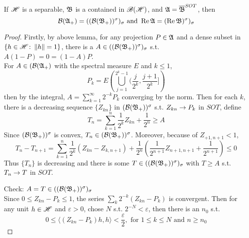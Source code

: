 \documentclass[a4paper,11pt]{report}
\begin{document}
\begin{thm}
	If $\mathscr{H}$ is a separable,  $\mathfrak{B}$ is a \Cs contained in $\mathscr{B(H)}$, and $\mathfrak{A} = \overline{\mathfrak{B}}^{SOT}$, then
	\begin{equation*}
		\mathcal{B}(\mathfrak{A}_+) = ((\mathcal{B}(\mathfrak{B}_+))^{\sigma})_{\sigma} \text{ and } \operatorname{Re}{\mathfrak{A}} = (\operatorname{Re}{\mathfrak{B}})^{\sigma})_{\sigma}
	\end{equation*}
\end{thm}
\begin{proof}
	Firstly, by above lemma, for any projection $P \in \mathfrak{A}$ and a dense subset in $\{h \in \mathscr{H} \colon \left\lVert h\right\lVert =1\}$, there is a $A \in ((\mathcal{B}(\mathfrak{B}_+))^{\sigma})_{\sigma}$ s.t. $A(1-P) = 0  = (1-A)P$.\\
	For $A \in (\mathcal{B}(\mathfrak{A}_+)$ with the spectral measure $E$ and $k \leqslant 1$,
	\begin{equation*}
		P_k = E \left(\bigcup_{j=1}^{2^k-1}(\frac{j}{2^k}, \frac{j+1}{2^k}] \right)
	\end{equation*}
	then by the integral, $A  =  \sum_{k=1}^{\infty}  2^{-k}P_k$ converging by the norm. Then for each $k$, there is a decreasing sequence $\{Z_{kn}\}$ in $(\mathcal{B}(\mathfrak{B}_+))^{\sigma}$ s.t. $Z_{kn} \rightarrow  P_k$ in $SOT$, define
	\begin{equation*}
		T_n = \sum_{k=1}^n \frac{1}{2^k} Z_{kn} + \frac{1}{2^n} \geqslant A
	\end{equation*}
	Since $(\mathcal{B}(\mathfrak{B}_+))^{\sigma}$ is convex, $T_n \in (\mathcal{B}(\mathfrak{B}_+))^{\sigma}$. Moreover, because of $Z_{+1,n+1} < 1$,
	\begin{equation*}
		T_{n} - T_{n+1}  = \sum_{k=1}^n \frac{1}{2^k} (Z_{kn} -  Z_{k,n+1}) + \frac{1}{2^n} (\frac{1}{2^{n+1}}Z_{n+1,n+1} + \frac{1}{2^{n+1}}) \leqslant 0
	\end{equation*}
	Thus $\{T_n\}$ is decreasing and there is some $T \in ((\mathcal{B}(\mathfrak{B}_+))^{\sigma})_{\sigma}$ with $T \geqslant A$ s.t. $T_n \rightarrow T$ in $SOT$.
	\item Check: $A = T \in ((\mathcal{B}(\mathfrak{B}_+))^{\sigma})_{\sigma}$ \\
	Since $0 \leqslant Z_{kn} - P_k \leqslant 1$, the series $\sum_k 2^{-k}(Z_{kn}-P_k)$ is convergent. Then for any unit $h \in \mathscr{H}$ and $\varepsilon > 0$, chose $N$ s.t. $2^{-N} < \varepsilon$, then there is an $n_0$ s.t. 
	\begin{equation*}
		0 \leqslant \langle (Z_{kn}-P_k) h,h \rangle < \frac{\varepsilon}{2}, \text{ for } 1 \leqslant k \leqslant N \text{ and } n \geqslant n_0
	\end{equation*}

\end{proof}
\end{document}
